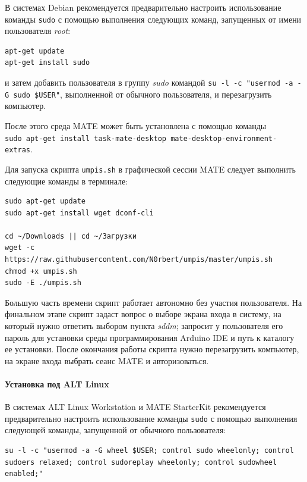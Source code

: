 \documentclass[
  a4paper,
]{book}
\theoremstyle{definition}
\theoremstyle{definition}
\theoremstyle{definition}
\theoremstyle{definition}
\theoremstyle{remark}
\begin{document}
В системах Debian рекомендуется предварительно настроить использование команды \texttt{sudo} с помощью выполнения следующих команд, запущенных от имени пользователя \emph{root}:

\begin{verbatim}
apt-get update
apt-get install sudo
\end{verbatim}

и затем добавить пользователя в группу \emph{sudo} командой \texttt{su\ -l\ -c\ "usermod\ -a\ -G\ sudo\ \$USER"}, выполненной от обычного пользователя, и перезагрузить компьютер.

После этого среда MATE может быть установлена с помощью команды \texttt{sudo\ apt-get\ install\ task-mate-desktop\ mate-desktop-environment-extras}.

Для запуска скрипта \texttt{umpis.sh} в графической сессии MATE следует выполнить следующие команды в терминале:

\begin{verbatim}
sudo apt-get update
sudo apt-get install wget dconf-cli

cd ~/Downloads || cd ~/Загрузки
wget -c https://raw.githubusercontent.com/N0rbert/umpis/master/umpis.sh
chmod +x umpis.sh
sudo -E ./umpis.sh
\end{verbatim}

Большую часть времени скрипт работает автономно без участия пользователя. На финальном этапе скрипт задаст вопрос о выборе экрана входа в систему, на который нужно ответить выбором пункта \emph{sddm}; запросит у пользователя его пароль для установки среды программирования Arduino IDE и путь к каталогу ее установки. После окончания работы скрипта нужно перезагрузить компьютер, на экране входа выбрать сеанс MATE и авторизоваться.

\hypertarget{software-r-linux-alt}{%
\paragraph{Установка под ALT Linux}\label{software-r-linux-alt}}

В системах ALT Linux Workstation и MATE StarterKit рекомендуется предварительно настроить использование команды \texttt{sudo} с помощью выполнения следующей команды, запущенной от обычного пользователя:

\begin{verbatim}
su -l -c "usermod -a -G wheel $USER; control sudo wheelonly; control sudoers relaxed; control sudoreplay wheelonly; control sudowheel enabled;"
\end{verbatim}
\end{document}
